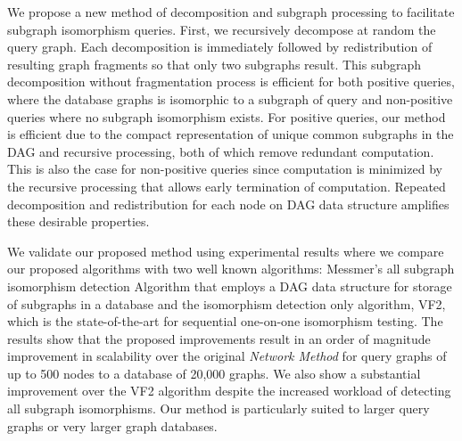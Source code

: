 We propose a new method of decomposition and subgraph processing to facilitate subgraph isomorphism queries. First, we recursively decompose at random  the query graph. Each decomposition is immediately followed by redistribution of resulting graph fragments so that only two subgraphs result. This subgraph decomposition without fragmentation process is efficient for both positive queries, where the database graphs is isomorphic to a subgraph of query and non-positive queries where no subgraph isomorphism exists. For positive queries, our method is efficient due to the compact representation of unique common subgraphs in the DAG  and recursive processing, both of which remove redundant computation. This is also the case for non-positive queries since computation is minimized by the recursive processing that allows early termination of computation. Repeated decomposition and redistribution for each node on DAG data structure amplifies these desirable properties. 


We validate our proposed method using experimental results where we compare our proposed algorithms with two well known algorithms: Messmer's all subgraph isomorphism detection Algorithm that employs a DAG data structure for storage of subgraphs in a database and the isomorphism detection only algorithm, VF2, which is the state-of-the-art for sequential one-on-one isomorphism testing. The results show that the proposed improvements result in an order of magnitude improvement in scalability over the original \textit{Network Method}  for query graphs of up to 500 nodes to a database of 20,000 graphs. We also show a substantial improvement over the VF2 algorithm despite the increased workload of detecting all subgraph isomorphisms. Our method is particularly suited to larger query graphs or very larger graph databases.

